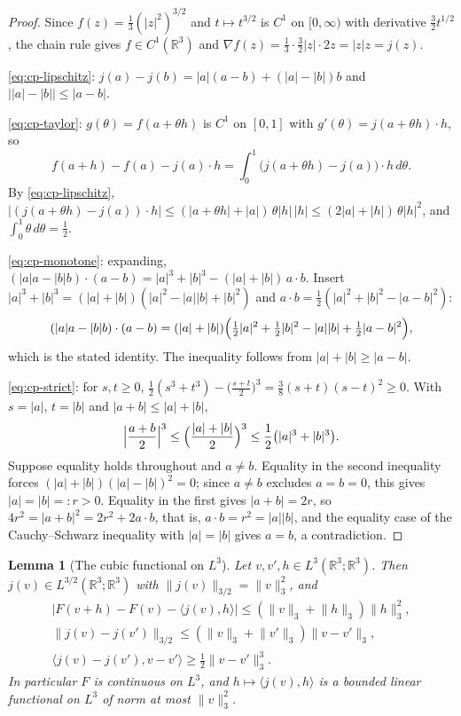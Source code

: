\documentclass[11pt]{article}
\newtheorem{lemma}[theorem]{Lemma}
\theoremstyle{definition}
\theoremstyle{plain}
\newcommand{\R}{\mathbb R}
\newcommand{\norm}[1]{\lVert #1\rVert}
\begin{document}
\begin{proof}
Since $f(z)=\frac13(|z|^2)^{3/2}$ and $t\mapsto t^{3/2}$ is $C^1$ on
$[0,\infty)$ with derivative $\frac32t^{1/2}$, the chain rule gives
$f\in C^1(\R^3)$ and $\nabla f(z)=\frac13\cdot\frac32|z|\cdot2z=|z|z=j(z)$.

\eqref{eq:cp-lipschitz}: $j(a)-j(b)=|a|(a-b)+(|a|-|b|)b$ and
$\bigl||a|-|b|\bigr|\le|a-b|$.

\eqref{eq:cp-taylor}: $g(\theta)=f(a+\theta h)$ is $C^1$ on $[0,1]$ with
$g'(\theta)=j(a+\theta h)\cdot h$, so
\[
 f(a+h)-f(a)-j(a)\cdot h=\int_0^1\bigl(j(a+\theta h)-j(a)\bigr)\cdot h\,d\theta .
\]
By \eqref{eq:cp-lipschitz},
$|(j(a+\theta h)-j(a))\cdot h|\le(|a+\theta h|+|a|)\,\theta|h|\,|h|
\le(2|a|+|h|)\,\theta|h|^2$, and $\int_0^1\theta\,d\theta=\frac12$.

\eqref{eq:cp-monotone}: expanding,
$(|a|a-|b|b)\cdot(a-b)=|a|^3+|b|^3-(|a|+|b|)\,a\cdot b$.  Insert
$|a|^3+|b|^3=(|a|+|b|)(|a|^2-|a||b|+|b|^2)$ and
$a\cdot b=\frac12(|a|^2+|b|^2-|a-b|^2)$:
\[
 (|a|a-|b|b)\cdot(a-b)
 =(|a|+|b|)\Bigl(\tfrac12|a|^2+\tfrac12|b|^2-|a||b|+\tfrac12|a-b|^2\Bigr),
\]
which is the stated identity.  The inequality follows from
$|a|+|b|\ge|a-b|$.

\eqref{eq:cp-strict}: for $s,t\ge0$,
$\frac12(s^3+t^3)-\bigl(\frac{s+t}2\bigr)^3=\frac38(s+t)(s-t)^2\ge0$.
With $s=|a|$, $t=|b|$ and $|a+b|\le|a|+|b|$,
\[
 \Bigl|\frac{a+b}2\Bigr|^3\le\Bigl(\frac{|a|+|b|}2\Bigr)^3
 \le\frac12\bigl(|a|^3+|b|^3\bigr).
\]
Suppose equality holds throughout and $a\ne b$.  Equality in the second
inequality forces $(|a|+|b|)(|a|-|b|)^2=0$; since $a\ne b$ excludes
$a=b=0$, this gives $|a|=|b|=:r>0$.  Equality in the first gives
$|a+b|=2r$, so $4r^2=|a+b|^2=2r^2+2a\cdot b$, that is, $a\cdot b=r^2=|a||b|$,
and the equality case of the Cauchy--Schwarz inequality with $|a|=|b|$
gives $a=b$, a contradiction.
\end{proof}

\begin{lemma}[The cubic functional on $L^3$]\label{lem:cubic-frechet}
Let $v,v',h\in L^3(\R^3;\R^3)$.  Then $j(v)\in L^{3/2}(\R^3;\R^3)$ with
$\norm{j(v)}_{3/2}=\norm v_3^2$, and
\begin{gather}
 \bigl|F(v+h)-F(v)-\langle j(v),h\rangle\bigr|
 \le(\norm v_3+\norm h_3)\norm h_3^2,
 \label{eq:cp-F-taylor}\\
 \norm{j(v)-j(v')}_{3/2}\le(\norm v_3+\norm{v'}_3)\norm{v-v'}_3,
 \label{eq:cp-F-lipschitz}\\
 \langle j(v)-j(v'),v-v'\rangle\ge\tfrac12\norm{v-v'}_3^3 .
 \label{eq:cp-F-monotone}
\end{gather}
In particular $F$ is continuous on $L^3$, and $h\mapsto\langle j(v),h\rangle$
is a bounded linear functional on $L^3$ of norm at most $\norm v_3^2$.
\end{lemma}
\end{document}
